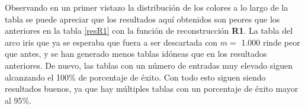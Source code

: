 \documentclass[12pt,spanish,listoffigures,listoftables,listofalgorithms]{tfgetsinf}
\begin{document}
\def\arraystretch{1.5}
\begin{table}[H]
	\LARGE
	\centering
	\caption{Porcentajes de éxito para las tablas empleando \textbf{R2}}
	\label{resR2}
\end{table}

Observando en un primer vistazo la distribución de los colores a lo largo de la tabla se puede apreciar que los resultados aquí obtenidos son peores que los anteriores en la tabla \ref{resR1} con la función de reconstrucción \textbf{R1}. La tabla del arco iris que ya se esperaba que fuera a ser descartada con $m =$ 1.000 rinde peor que antes, y se han generado menos tablas idóneas que en los resultados anteriores. De nuevo, las tablas con un número de entradas muy elevado siguen alcanzando el 100\% de porcentaje de éxito. Con todo esto siguen siendo resultados buenos, ya que hay múltiples tablas con un porcentaje de éxito mayor al 95\%.
\end{document}
